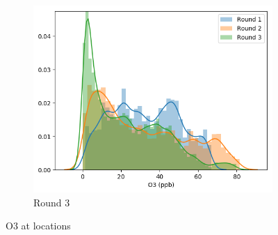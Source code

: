 \documentclass[journal abbreviation, manuscript]{copernicus}
\begin{document}
\begin{figure}[H]
\begin{subfigure}{0.32\textwidth}
\includegraphics[width=\textwidth]{results/distributions/location_shafter_o3.png}
\caption{Round 3}
\end{subfigure}
\caption{O3 at locations}
\label{fig:o3-locations}
\end{figure}

\fi
\end{document}

